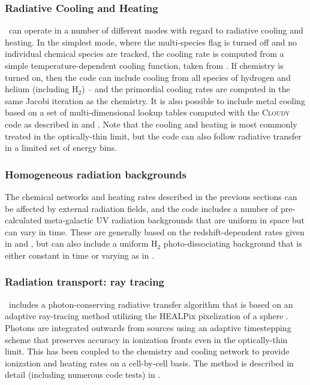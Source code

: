 \subsubsection{Radiative Cooling and Heating}

\enzo\ can operate in a number of different modes with regard to
radiative cooling and heating. In the simplest mode, where the
multi-species flag is turned off and no individual chemical species
are tracked, the cooling rate is computed from a
simple temperature-dependent cooling function, taken from
\citet{SW87}.  If chemistry is turned on, then the code can include
cooling from all species of hydrogen and helium (including H$_2$) --
and the primordial cooling rates are computed in the same Jacobi iteration as the
chemistry.  It is also possible to include metal cooling based on a
set of multi-dimensional lookup tables computed with the
\textsc{Cloudy} code \citep{1998PASP..110..761F} as described in
\citet{2008MNRAS.385.1443S} and \citet{2011ApJ...731....6S}. Note that
the cooling and heating is most commonly treated in the optically-thin
limit, but the code can also follow radiative transfer in a limited
set of energy bins.

\subsubsection{Homogeneous radiation backgrounds}

The chemical networks and heating rates described in the previous
sections can be affected by external radiation fields, and the code
includes a number of pre-calculated meta-galactic UV radiation
backgrounds that are uniform in space but can vary in time.  These are
generally based on the redshift-dependent rates given in
\citet{1996ApJ...461...20H} and \citet{2012ApJ...746..125H}, but can
also include a uniform H$_2$ photo-dissociating background that is
either constant in time or varying as in \citet{WiseAbel05}.

\subsubsection{Radiation transport: ray tracing}

\enzo\ includes a photon-conserving radiative transfer algorithm that
is based on an adaptive ray-tracing method utilizing the HEALPix
pixelization of a sphere \citep{Abel02_RT}. Photons are integrated
outwards from sources using an adaptive timestepping scheme that
preserves accuracy in ionization fronts even in the optically-thin
limit. This has been coupled to the chemistry and cooling network to
provide ionization and heating rates on a cell-by-cell basis. The
method is described in detail (including numerous code tests) in
\citet{Wise11_Moray}.

